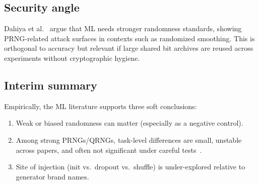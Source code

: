 \subsection{Security angle}

Dahiya et al.~\cite{dahiya2024mlrandomness} argue that ML needs stronger randomness standards, showing PRNG-related attack surfaces in contexts such as randomized smoothing.
This is orthogonal to accuracy but relevant if large shared bit archives are reused across experiments without cryptographic hygiene.

\subsection{Interim summary}

Empirically, the ML literature supports three soft conclusions:
\begin{enumerate}[leftmargin=*]
  \item Weak or biased randomness can matter (especially as a negative control).
  \item Among strong PRNGs/QRNGs, task-level differences are small, unstable across papers, and often not significant under careful tests~\cite{heese2024biased,antunes2025influence}.
  \item Site of injection (init vs.\ dropout vs.\ shuffle) is under-explored relative to generator brand names.
\end{enumerate}
